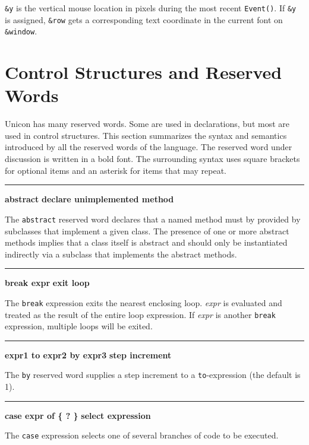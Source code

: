 \noindent
\texttt{\&y} is the vertical mouse location in pixels during the most
recent \texttt{Event()}. If \texttt{\&y} is assigned, \texttt{\&row}
gets a corresponding text coordinate in the current font on
\texttt{\&window}.

\section{Control Structures and Reserved Words}

Unicon has many reserved words. Some are used in
declarations, but most are used in control
structures. This section summarizes the syntax and semantics
introduced by all the reserved words of the language. The reserved
word under discussion is written in a bold font. The surrounding
syntax uses square brackets for optional items and an asterisk for
items that may repeat.

\bigskip\hrule\vspace{0.1cm}
\noindent
{\bf abstract} \hfill {\bf declare unimplemented method}

\noindent
The \texttt{abstract} reserved word declares that a
named method must by provided by subclasses that implement a given
class. The presence of one or more abstract methods implies that a
class itself is abstract and should only be instantiated indirectly
via a subclass that implements the abstract methods.


\bigskip\hrule\vspace{0.1cm}
\noindent
{\bf break expr } \hfill {\bf exit loop}

\noindent
The \texttt{break} expression exits the nearest
enclosing loop. \textit{expr} is evaluated and treated as the result of
the entire loop expression. If \textit{expr} is another
\texttt{break} expression, multiple loops will be exited.

\bigskip\hrule\vspace{0.1cm}
\noindent
{\bf expr1 to expr2 by expr3 } \hfill {\bf step increment}

\noindent
{}The \texttt{by} reserved word supplies a step
increment to a \texttt{to}{}-expression (the default is 1).

\bigskip\hrule\vspace{0.1cm}
\noindent
{\bf case expr of \{ ? \} } \hfill {\bf select expression}

\noindent
The \texttt{case} expression selects one of
several branches of code to be executed.

